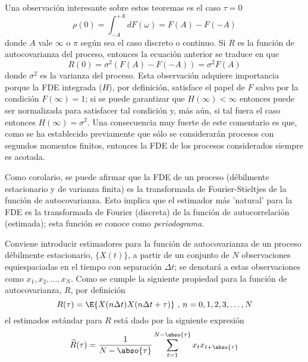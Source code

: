 Una observaci\'on interesante sobre estos teoremas es el caso $\tau = 0$
\begin{equation*}
\rho(0) = \int_{-A}^{+A} dF(\omega) = F(A) - F(-A)
\end{equation*}
donde $A$ vale $\infty$ o $\pi$ seg\'un sea el caso discreto o continuo. Si $R$ es la funci\'on de
autocovarianza del proceso, entonces la ecuaci\'on anterior se traduce en que
\begin{equation*}
R(0) = \sigma^{2} \left( F(A) - F(-A) \right) = \sigma^{2} F(A)
\end{equation*}
donde $\sigma^{2}$ es la varianza del proceso. 
Esta observaci\'on adquiere importancia porque la FDE integrada ($H$), por definici\'on, satisface 
el papel de $F$ salvo por la condici\'on $F(\infty)=1$; si se puede garantizar que 
$H(\infty)<\infty$ entonces puede ser normalizada para satisfacer tal condici\'on y, m\'as a\'un,
si tal fuera el caso entonces $H(\infty)=\sigma^{2}$. Una consecuencia muy fuerte de este 
comentario es que, como se ha establecido previamente que s\'olo se considerar\'an procesos con
segundos momentos finitos, entonces la FDE de los procesos considerados siempre es acotada.

Como corolario, se puede afirmar que la FDE de un proceso (d\'ebilmente estacionario y de varianza
finita) es la transformada de Fourier-Stieltjes de la funci\'on de autocovarianza.
Esto implica que el estimador m\'as 'natural' para la FDE es la transformada de Fourier (discreta) 
de la funci\'on de autocorrelaci\'on (estimada); esta funci\'on se conoce como 
\textit{periodograma}. 

Conviene introducir estimadores para la funci\'on de autocovarianza de un proceso d\'ebilmente 
estacionario, $\{ X(t) \}$, a partir de un conjunto de $N$ observaciones equiespaciadas en el 
tiempo con separaci\'on $\Delta t$; se denotar\'a a estas observaciones como 
$x_1, x_2 , \dots, x_N$. Como se cumple la siguiente propiedad para la funci\'on de autocovarianza, 
$R$, por definici\'on
\begin{equation*}
R(\tau) = \E{X(n\Delta t)X(n\Delta t + \tau)} \text{  ,  } n = 0, 1, 2,  3,\dots, N
\end{equation*}
el estimados est\'andar para $R$ est\'a dado por la siguiente expresi\'on
\begin{equation*}
\widehat{R}(\tau) = \frac{1}{N-\abso{\tau}} 
\sum_{t = 1}^{N-\abso{\tau}} x_t x_{t+\abso{\tau}}
\label{estimador_R}
\end{equation*}

